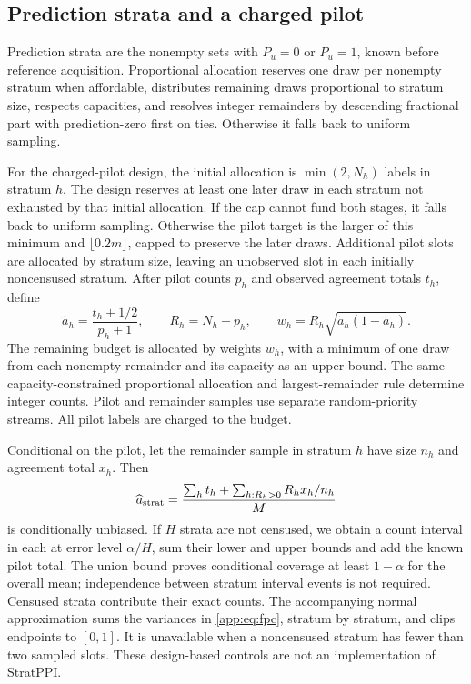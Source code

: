 \subsection{Prediction strata and a charged pilot}
\label{app:strata}

Prediction strata are the nonempty sets with $P_u=0$ or $P_u=1$, known before
reference acquisition. Proportional allocation reserves one draw per
nonempty stratum when affordable, distributes remaining draws proportional
to stratum size, respects capacities, and resolves integer remainders by
descending fractional part with prediction-zero first on ties. Otherwise it
falls back to uniform sampling.

For the charged-pilot design, the initial allocation is
$\min(2,N_h)$ labels in stratum $h$. The design reserves at least one later
draw in each stratum not exhausted by that initial allocation. If the cap
cannot fund both stages, it falls back to uniform sampling. Otherwise the
pilot target is the larger of this minimum and $\lfloor0.2m\rfloor$, capped
to preserve the later draws. Additional pilot slots are allocated by stratum
size, leaving an unobserved slot in each initially noncensused stratum.
After pilot counts $p_h$ and observed agreement totals $t_h$, define
\[
 \widetilde a_h=\frac{t_h+1/2}{p_h+1},\qquad
 R_h=N_h-p_h,\qquad
 w_h=R_h\sqrt{\widetilde a_h(1-\widetilde a_h)}.
\]
The remaining budget is allocated by weights $w_h$, with a minimum of one
draw from each nonempty remainder and its capacity as an upper bound. The
same capacity-constrained proportional allocation and largest-remainder
rule determine integer counts. Pilot and remainder samples use separate
random-priority streams. All pilot labels are charged to the budget.

Conditional on the pilot, let the remainder sample in stratum $h$ have size
$n_h$ and agreement total $x_h$. Then
\begin{equation}
 \widehat a_{\rm strat}
 =\frac{\sum_h t_h+\sum_{h:R_h>0}R_hx_h/n_h}{M}
 \label{app:eq:strat-estimator}
\end{equation}
is conditionally unbiased. If $H$ strata are not censused, we obtain a count
interval in each at error level $\alpha/H$, sum their lower and upper bounds
and add the known pilot total. The union bound proves conditional coverage
at least $1-\alpha$ for the overall mean; independence between stratum
interval events is not required. Censused strata contribute their exact
counts. The accompanying normal approximation sums the variances in
\eqref{app:eq:fpc}, stratum by stratum, and clips endpoints to $[0,1]$.
It is unavailable when a noncensused stratum has fewer than two sampled
slots. These design-based controls are not an implementation of StratPPI.

